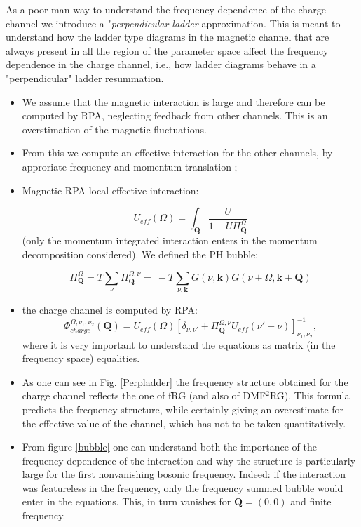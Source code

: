 As a poor man way to understand the frequency dependence of the charge channel we introduce a "\emph{perpendicular ladder} approximation. This is meant to understand how the ladder type diagrams in the magnetic channel that are always present in all the region of the parameter space affect the frequency dependence in the charge channel, i.e., how ladder diagrams behave in a "perpendicular" ladder resummation.

\begin{itemize}
\item We assume that the magnetic interaction is large and therefore can be computed by RPA, neglecting feedback from other channels. This is an overstimation of the magnetic fluctuations. 

\item From this we compute an effective interaction for the other channels, by approriate frequency and momentum translation ; 

\item Magnetic RPA local effective interaction:

\begin{equation}
  U_{eff}(\Omega) =\int_{\boldsymbol{Q}} \frac{U}{ 1 - U \Pi^{\Omega}_{\boldsymbol{Q}} }
\end{equation}
(only the momentum integrated interaction enters in the momentum decomposition considered). We defined 
the PH bubble:

\begin{equation}
\Pi^{\Omega}_{\boldsymbol{Q}} = T\sum_{\nu} \Pi^{\Omega,\nu}_{\boldsymbol{Q}} = \
-T\sum_{\nu,\boldsymbol{k}} G(\nu,\boldsymbol{k})G(\nu+\Omega,\boldsymbol{k}+\boldsymbol{Q})
\end{equation}

\item the charge channel is computed by RPA: 
\begin{equation}
  \Phi_{charge}^{\Omega,\nu_1,\nu_2}(\boldsymbol{Q}) = U_{eff}(\Omega) 
  \left[ \delta_{\nu,\nu'}+  \Pi^{\Omega,\nu}_{\boldsymbol{Q}} U_{eff}(\nu'-\nu) \right]_{\nu_1,\nu_2}^{-1},
\end{equation}
where it is very important to understand the equations as matrix (in the frequency space) equalities. 

\item As one can see in Fig. \ref{Perpladder} the frequency structure obtained for the charge channel reflects the one of fRG (and also of DMF$^2$RG). 
This formula predicts the frequency structure, while certainly giving an overestimate for the effective value of the channel, which has not  to be taken quantitatively. 

\item From figure \ref{bubble} one can understand both the importance of the frequency dependence of the interaction and why the structure is particularly large for the first nonvanishing bosonic frequency. 
Indeed: if the interaction was featureless in the frequency, only the frequency summed bubble would enter in the equations. This, in turn vanishes for $\mathbf{Q}=(0,0)$ and finite frequency.  

\end{itemize}

